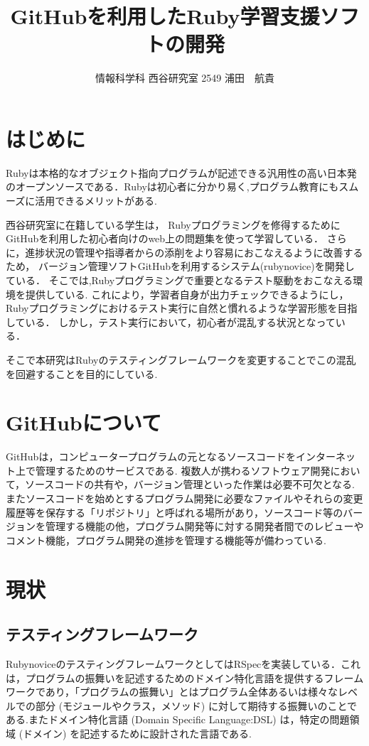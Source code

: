 \documentclass[a4j,twocolumn,uplatex]{jarticle}
\begin{document}
\title{GitHubを利用したRuby学習支援ソフトの開発}
\author{情報科学科 西谷研究室 2549 浦田　航貴}
\date{}
\maketitle
\section{はじめに}
Rubyは本格的なオブジェクト指向プログラムが記述できる汎用性の高い日本発のオープンソースである．Rubyは初心者に分かり易く,プログラム教育にもスムーズに活用できるメリットがある\cite{1}.

西谷研究室に在籍している学生は，
Rubyプログラミングを修得するためにGitHubを利用した初心者向けのweb上の問題集を使って学習している．
さらに，進捗状況の管理や指導者からの添削をより容易におこなえるように改善するため，
バージョン管理ソフトGitHubを利用するシステム(rubynovice)を開発している．
そこでは,Rubyプログラミングで重要となるテスト駆動をおこなえる環境を提供している.
これにより，学習者自身が出力チェックできるようにし，
Rubyプログラミングにおけるテスト実行に自然と慣れるような学習形態を目指している．
しかし，テスト実行において，初心者が混乱する状況となっている．

そこで本研究はRubyのテスティングフレームワークを変更することでこの混乱を回避することを目的にしている.

\section{GitHubについて}
GitHubは，コンピュータープログラムの元となるソースコードをインターネット上で管理するためのサービスである.
複数人が携わるソフトウェア開発において，ソースコードの共有や，バージョン管理といった作業は必要不可欠となる.
またソースコードを始めとするプログラム開発に必要なファイルやそれらの変更履歴等を保存する「リポジトリ」と呼ばれる場所があり，ソースコード等のバージョンを管理する機能の他，プログラム開発等に対する開発者間でのレビューやコメント機能，プログラム開発の進捗を管理する機能等が備わっている\cite{2}.

\section{現状}
\subsection{テスティングフレームワーク}
RubynoviceのテスティングフレームワークとしてはRSpecを実装している．これは，プログラムの振舞いを記述するためのドメイン特化言語を提供するフレームワークであり，「プログラムの振舞い」とはプログラム全体あるいは様々なレベルでの部分 (モジュールやクラス，メソッド) に対して期待する振舞いのことである.またドメイン特化言語 (Domain Specific Language:DSL) は，特定の問題領域 (ドメイン) を記述するために設計された言語である\cite{3}.
\end{document}
